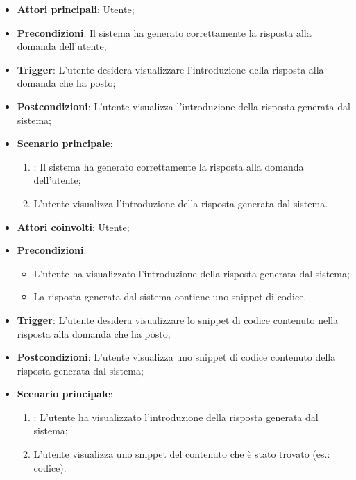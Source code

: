 \begin{itemize}
    \item \textbf{Attori principali}: Utente;
    \item \textbf{Precondizioni}: Il sistema ha generato correttamente la risposta alla domanda dell'utente;
    \item \textbf{Trigger}: L'utente desidera visualizzare l'introduzione della risposta alla domanda che ha posto;
    \item \textbf{Postcondizioni}: L'utente visualizza l'introduzione della risposta generata dal sistema;
    \item \textbf{Scenario principale}:
    \begin{enumerate}
        \item {}: Il sistema ha generato correttamente la risposta alla domanda dell'utente;
        \item L'utente visualizza l'introduzione della risposta generata dal sistema.
    \end{enumerate}
\end{itemize}



\hypertarget{UC5.2}{}

\begin{itemize}
    \item \textbf{Attori coinvolti}: Utente;
    \item \textbf{Precondizioni}: 
    \begin{itemize}
        \item L'utente ha visualizzato l'introduzione della risposta generata dal sistema;
        \item La risposta generata dal sistema contiene uno snippet di codice.
    \end{itemize}
    \item \textbf{Trigger}: L'utente desidera visualizzare lo snippet di codice contenuto nella risposta alla domanda che ha posto;
    \item \textbf{Postcondizioni}: L'utente visualizza uno snippet di codice contenuto della risposta generata dal sistema;
    \item \textbf{Scenario principale}:
    \begin{enumerate}
        \item {}: L'utente ha visualizzato l'introduzione della risposta generata dal sistema;
        \item L'utente visualizza uno snippet del contenuto che è stato trovato (es.: codice).
    \end{enumerate}
\end{itemize}



